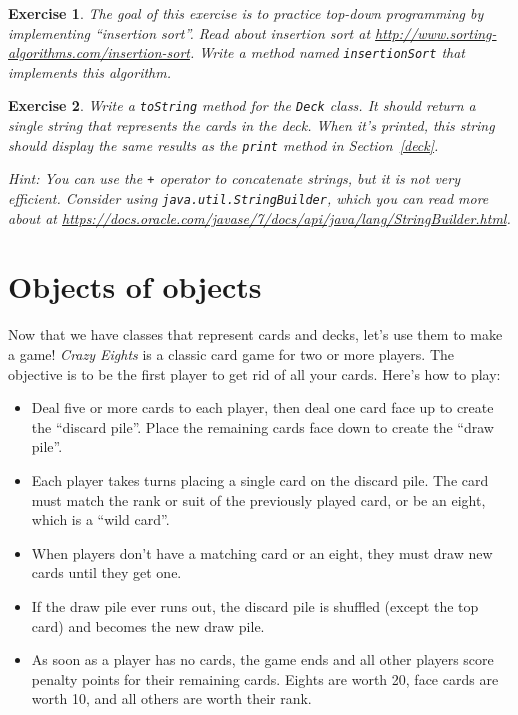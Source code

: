 \documentclass[12pt]{book}
\theoremstyle{exercise}
\newtheorem{exercise}{Exercise}[chapter]
\newcommand{\java}[1]{\verb"#1"}
\begin{document}
\begin{exercise}
The goal of this exercise is to practice top-down programming by implementing ``insertion sort''.
Read about insertion sort at \url{http://www.sorting-algorithms.com/insertion-sort}.
Write a method named \java{insertionSort} that implements this algorithm.
\end{exercise}


\begin{exercise}

Write a \java{toString} method for the \java{Deck} class.
It should return a single string that represents the cards in the deck.
When it's printed, this string should display the same results as the \java{print} method in Section~\ref{deck}.

Hint: You can use the \java{+} operator to concatenate strings, but it is not very efficient.
Consider using \java{java.util.StringBuilder}, which you can read more about at \url{https://docs.oracle.com/javase/7/docs/api/java/lang/StringBuilder.html}.

\end{exercise}


\chapter{Objects of objects}
\label{eights}



Now that we have classes that represent cards and decks, let's use them to make a game!
{\it Crazy Eights} is a classic card game for two or more players.
The objective is to be the first player to get rid of all your cards.
Here's how to play:

\begin{itemize}

\item Deal five or more cards to each player, then deal one card face up to create the ``discard pile''.
Place the remaining cards face down to create the ``draw pile''.

\item Each player takes turns placing a single card on the discard pile.
The card must match the rank or suit of the previously played card, or be an eight, which is a ``wild card''.

\item When players don't have a matching card or an eight, they must draw new cards until they get one.

\item If the draw pile ever runs out, the discard pile is shuffled (except the top card) and becomes the new draw pile.

\item As soon as a player has no cards, the game ends and all other players score penalty points for their remaining cards.
Eights are worth 20, face cards are worth 10, and all others are worth their rank.

\end{itemize}
\end{document}
